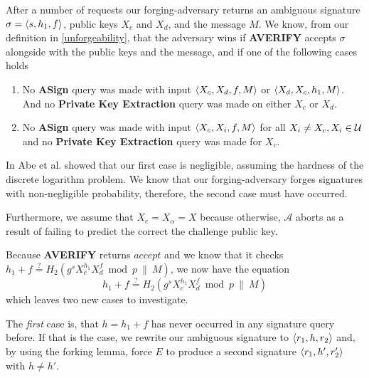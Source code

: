 After a number of requests our forging-adversary returns an ambiguous signature \(\sigma = \langle s,h_1, f \rangle\), public keys \(X_c\) and \(X_d\), and the message \(M\).
We know, from our definition in \ref{unforgeability}, that the adversary wins if \textbf{AVERIFY} accepts \(\sigma\) alongside with the public keys and the message, and if one of the following cases holds
  \begin{enumerate}
    \item No \textbf{ASign} query was made with input \(\langle X_c, X_d, f, M \rangle\) or \(\langle X_d, X_c, h_1, M \rangle\).
          And no \textbf{Private Key Extraction} query was made on either \(X_c\) or \(X_d\).
    \item No \textbf{ASign} query was made with input \(\langle X_c, X_i, f, M \rangle\) for all \(X_i \neq X_c, X_i\in\mathcal{U}\) and no \textbf{Private Key Extraction} query was made for \(X_c\).
  \end{enumerate}

In \cite{abe20021} Abe et al. showed that our first case is negligible, assuming the hardness of the discrete logarithm problem. 
We know that our forging-adversary forges signatures with non-negligible probability, therefore, the second case must have occurred.

Furthermore, we assume that \(X_c = X_\alpha = X\) because otherwise, \(\mathcal{A}\) aborts as a result of failing to predict the correct the challenge public key.

Because \textbf{AVERIFY} returns \(accept\) and we know that it checks \(h_1 + f \overset{?}{=} H_2(g^s X_{c}^{h_1} X_d^f \bmod p ~\|~ M)\), we now have the equation
\[h_1 + f \overset{?}{=} H_2(g^s X_{c}^{h_1} X_d^f \bmod p ~\|~ M)\]
which leaves two new cases to investigate.

The \textit{first} case is, that \(h = h_1 + f\) has never occurred in any signature query before.
If that is the case, we rewrite our ambiguous signature to \(\langle r_1, h, r_2 \rangle\) and, by using the forking lemma, force \(E\) to produce a second signature \(\langle r_1, h', r_2' \rangle\) with \(h\neq h'\).

